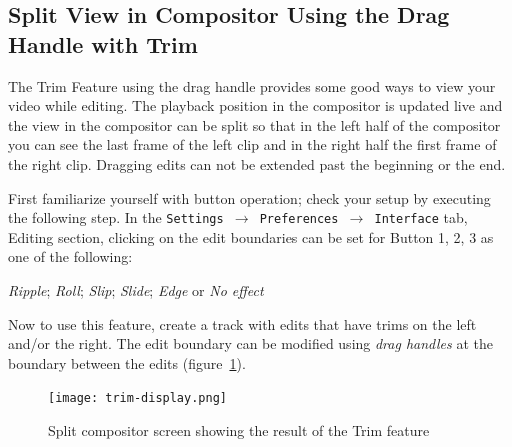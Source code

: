 \subsection{Split View in Compositor Using the Drag Handle with Trim}%
\label{sub:split_view_compositor_using_drag_trim}

The Trim Feature using the drag handle provides some good ways to
view your video while editing.  The playback position in the
compositor is updated live and the view in the compositor can be
split so that in the left half of the compositor you can see the
last frame of the left clip and in the right half the first frame of
the right clip.  Dragging edits can not be extended past the
beginning or the end.

First familiarize yourself with button operation; check your setup
by executing the following step.  In the \texttt{Settings
  $\rightarrow$ Preferences $\rightarrow$ Interface} tab, Editing
section, clicking on the edit boundaries can be set for Button 1, 2,
3 as one of the following:

\textit{Ripple}; \textit{Roll}; \textit{Slip}; \textit{Slide};
\textit{Edge} or \textit{No effect}

Now to use this feature, create a track with edits that have trims
on the left and/or the right. The edit boundary can be modified
using \textit{drag handles} at the boundary between the edits
(figure~\ref{fig:trim-display}).

\begin{figure}[htpb]
  \centering
  \texttt{[image: trim-display.png]}
  \caption{Split compositor screen showing the result of the Trim feature}
  \label{fig:trim-display}
\end{figure}

